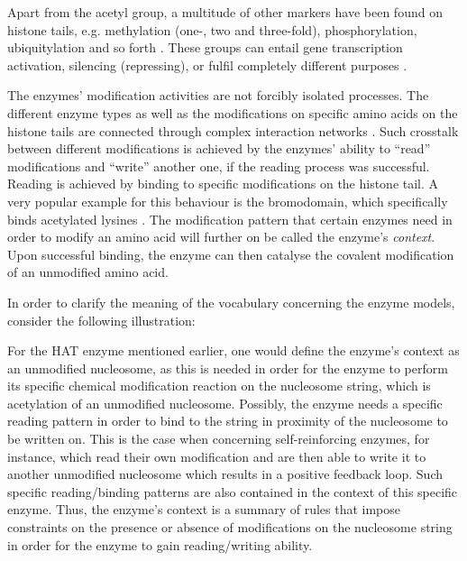             Apart from the acetyl group, a multitude of other markers have been found on histone tails, e.g. methylation (one-, two and three-fold), phosphorylation, ubiquitylation and so forth \cite{bannister2011regulation}. These groups can entail gene transcription activation, silencing (repressing), or fulfil completely different purposes \cite{rossetto2012histone,wang2006histone}. %

            The enzymes' modification activities are not forcibly isolated processes. The different enzyme types as well as the modifications on specific amino acids on the histone tails are connected through complex interaction networks \cite{zhang2015interplay, musselman2012perceiving, ge2019nucleation}. Such crosstalk between different modifications is achieved by the enzymes' ability to “read” modifications and “write” another one, if the reading process was successful. Reading is achieved by binding to specific modifications on the histone tail. A very popular example for this behaviour is the bromodomain, which specifically binds acetylated lysines \cite{zeng2002bromodomain}. The modification pattern that certain enzymes need in order to modify an amino acid will further on be called the enzyme's \textit{context}. Upon successful binding, the enzyme can then catalyse the covalent modification of an unmodified amino acid.

            In order to clarify the meaning of the vocabulary concerning the enzyme models, consider the following illustration:

            For the HAT enzyme mentioned earlier, one would define the enzyme’s context as an unmodified nucleosome, as this is needed in order for the enzyme to perform its specific chemical modification reaction on the nucleosome string, which is acetylation of an unmodified nucleosome. Possibly, the enzyme needs a specific reading pattern in order to bind to the string in proximity of the nucleosome to be written on. This is the case when concerning self-reinforcing enzymes, for instance, which read their own modification and are then able to write it to another unmodified nucleosome which results in a positive feedback loop. Such specific reading/binding patterns are also contained in the context of this specific enzyme. Thus, the enzyme’s context is a summary of rules that impose constraints on the presence or absence of modifications on the nucleosome string in order for the enzyme to gain reading/writing ability.\\

